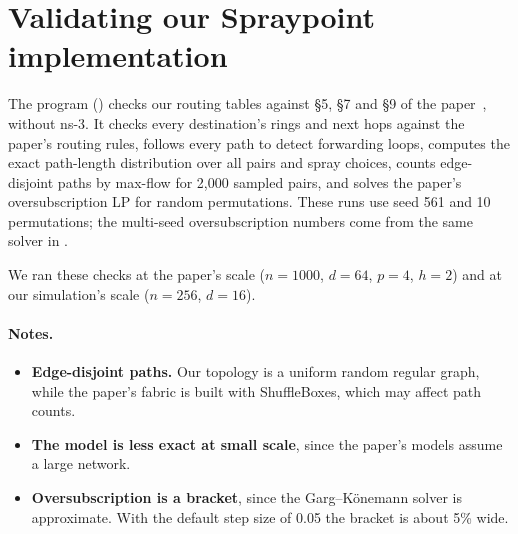 \section{Validating our Spraypoint implementation}
\label{app:validation}

The program  () checks our routing tables against §5, §7 and §9 of the paper~\cite{rng}, without ns-3. It checks every destination's rings and next hops against the paper's routing rules, follows every path to detect forwarding loops, computes the exact path-length distribution over all pairs and spray choices, counts edge-disjoint paths by max-flow for 2{,}000 sampled pairs, and solves the paper's oversubscription LP for random permutations. These runs use seed 561 and 10 permutations; the multi-seed oversubscription numbers come from the same solver in .

We ran these checks at the paper's scale ($n = 1000$, $d = 64$, $p = 4$, $h = 2$) and at our simulation's scale ($n = 256$, $d = 16$).

\paragraph{Notes.}
\begin{itemize}
  \item \textbf{Edge-disjoint paths.} Our topology is a uniform random regular graph, while the paper's fabric is built with ShuffleBoxes, which may affect path counts.
  \item \textbf{The model is less exact at small scale}, since the paper's models assume a large network.
  \item \textbf{Oversubscription is a bracket}, since the Garg--K\"onemann solver is approximate. With the default step size of 0.05 the bracket is about 5\% wide.
\end{itemize}
